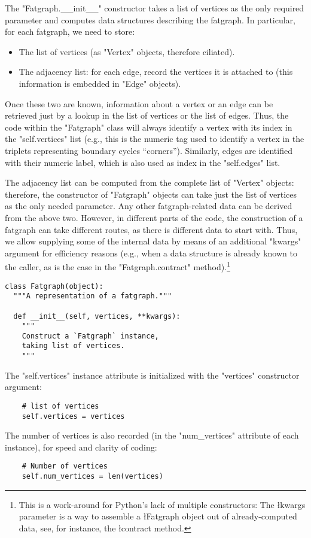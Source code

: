The "Fatgraph.__init__" constructor takes a list of vertices as the
only required parameter and computes data structures describing
the fatgraph.  In particular, for each fatgraph, we need to store:
\begin{itemize}
\item The list of vertices (as "Vertex" objects, therefore ciliated).
\item The adjacency list: for each edge, record the vertices it is
  attached to (this information is embedded in "Edge" objects).
\end{itemize}
Once these two are known, information about a vertex or an edge can be
retrieved just by a lookup in the list of vertices or the list of
edges.  Thus, the code within the "Fatgraph" class will always
identify a vertex with its index in the "self.vertices" list (e.g.,
this is the numeric tag used to identify a vertex in the triplets
representing boundary cycles ``corners''). Similarly, edges are
identified with their numeric label, which is also used as index in
the "self.edges" list.

The adjacency list can be computed from the complete list of "Vertex" objects:
therefore, the constructor of "Fatgraph" objects can take just the
list of vertices as the only needed parameter.  Any other
fatgraph-related data can be derived from the above two.  However, in
different parts of the code, the construction of a fatgraph can take
different routes, as there is different data to start with.
Thus, we allow supplying some of the internal data by means of an
additional "kwargs" argument for efficiency reasons (e.g., when a data
structure is already known to the caller, as is the case in the
"Fatgraph.contract" method).\footnote{This is a
  work-around for Python's lack of multiple constructors: The
  \l{kwargs} parameter is a way to assemble a \l{Fatgraph} object out of
  already-computed data, see, for instance, the \l{contract}
  method.}
\begin{lstlisting}
class Fatgraph(object):
  """A representation of a fatgraph."""

  def __init__(self, vertices, **kwargs):
    """
    Construct a `Fatgraph` instance, 
    taking list of vertices.
    """
\end{lstlisting}
The "self.vertices" instance attribute is initialized with the
"vertices" constructor argument:
\begin{lstlisting}
    # list of vertices
    self.vertices = vertices

\end{lstlisting}
The number of vertices is also recorded (in the "num_vertices"
attribute of each instance), for speed and clarity of coding:
\begin{lstlisting}
    # Number of vertices  
    self.num_vertices = len(vertices)

\end{lstlisting}

